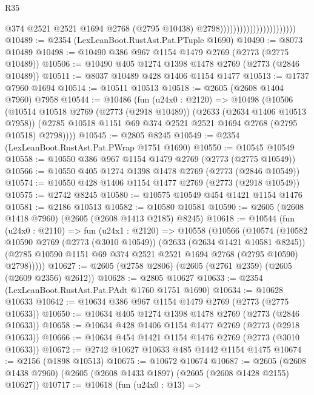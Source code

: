 \begin{lexlean}{R35}
\begin{coremodule}
                                                  @374
                                                  @2521
                                                  @2521
                                                  @1694
                                                  @2768
                                                  (@2795 @10438)
                                                  @2798)))))))))))))))))))))))
@10489 := @2354 (LexLeanBoot.RustAst.Pat.PTuple @1690)
@10490 := @8073 @10489
@10498 := @10490 @386 @967 @1154 @1479 @2769 (@2773 (@2775 @10489))
@10506 := @10490 @405 @1274 @1398 @1478 @2769 (@2773 (@2846 @10489))
@10511 := @8037 @10489 @428 @1406 @1154 @1477
@10513 := @1737 @7960 @1694
@10514 := @10511 @10513
@10518 := @2605 (@2608 @1404 @7960) @7958
@10544 := @10486
    (fun (u24x0 : @2120) =>
    @10498
      (@10506
        (@10514
          @10518
          @2769
          (@2773 (@2918 @10489))
          (@2633 (@2634 @1406 @10513 @7958))
          (@2785 @10518 @1151 @69 @374 @2521 @2521 @1694 @2768 (@2795 @10518) @2798))))
@10545 := @2805 @8245
@10549 := @2354 (LexLeanBoot.RustAst.Pat.PWrap @1751 @1690)
@10550 := @10545 @10549
@10558 := @10550 @386 @967 @1154 @1479 @2769 (@2773 (@2775 @10549))
@10566 := @10550 @405 @1274 @1398 @1478 @2769 (@2773 (@2846 @10549))
@10574 := @10550 @428 @1406 @1154 @1477 @2769 (@2773 (@2918 @10549))
@10575 := @2742 @8245
@10580 := @10575 @10549 @454 @1421 @1154 @1476
@10581 := @2186 @10513
@10582 := @10580 @10581
@10590 := @2605 (@2608 @1418 @7960) (@2605 (@2608 @1413 @2185) @8245)
@10618 := @10544
    (fun (u24x0 : @2110) =>
    fun (u24x1 : @2120) =>
    @10558
      (@10566
        (@10574
          (@10582
            @10590
            @2769
            (@2773 (@3010 @10549))
            (@2633 (@2634 @1421 @10581 @8245))
            (@2785 @10590 @1151 @69 @374 @2521 @2521 @1694 @2768 (@2795 @10590) @2798)))))
@10627 := @2605 (@2758 @2806) (@2605 (@2761 @2359) (@2605 (@2609 @2356) @2612))
@10628 := @2805 @10627
@10633 := @2354 (LexLeanBoot.RustAst.Pat.PAdt @1760 @1751 @1690)
@10634 := @10628 @10633
@10642 := @10634 @386 @967 @1154 @1479 @2769 (@2773 (@2775 @10633))
@10650 := @10634 @405 @1274 @1398 @1478 @2769 (@2773 (@2846 @10633))
@10658 := @10634 @428 @1406 @1154 @1477 @2769 (@2773 (@2918 @10633))
@10666 := @10634 @454 @1421 @1154 @1476 @2769 (@2773 (@3010 @10633))
@10672 := @2742 @10627 @10633 @485 @1442 @1154 @1475
@10674 := @2156 (@1898 @10513)
@10675 := @10672 @10674
@10687 := @2605 (@2608 @1438 @7960) (@2605 (@2608 @1433 @1897) (@2605 (@2608 @1428 @2155) @10627))
@10717 := @10618
    (fun (u24x0 : @13) =>

\end{coremodule}
\end{lexlean}
